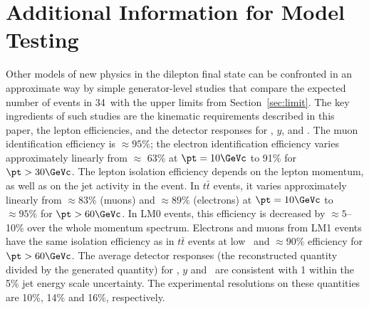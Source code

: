 \section{Additional Information for Model Testing}
\label{sec:outreach}
Other models of new physics in the dilepton final state can be confronted in an approximate way by simple 
generator-level studies that compare the expected number of events in 34\pbinv\ 
with the upper limits from Section~\ref{sec:limit}.
The key ingredients of such studies are the kinematic requirements described 
in this paper, the lepton efficiencies, and the detector responses for \HT, $y$, and \MET.
%
The muon identification efficiency is $\approx 95\%$;
the electron identification efficiency varies approximately linearly from $\approx$ 63\% at 
$\pt = 10\GeVc$ to 91\% for $\pt > 30\GeVc$.  
%
The lepton isolation efficiency depends on the lepton momentum, as well as on the jet activity in the 
event.
In $t\bar{t}$ events, it varies approximately linearly from $\approx 83\%$ (muons)
and $\approx 89\%$ (electrons) at $\pt=10\GeVc$ to $\approx 95\%$ for $\pt>60\GeVc$. 
In LM0 events, this efficiency is decreased by $\approx 5$--10\% over the whole momentum spectrum.
Electrons and muons from LM1 events have the same isolation efficiency as in $t\bar{t}$ events
at low \pt\ and $\approx 90$\% efficiency for $\pt>60\GeVc$.  
%
The average detector responses (the reconstructed quantity divided by the generated quantity) 
for \HT, $y$ and \MET\ are consistent with 1 within the 5\% jet energy scale uncertainty.
The experimental resolutions on these quantities are 10\%, 14\% and 16\%, respectively.



